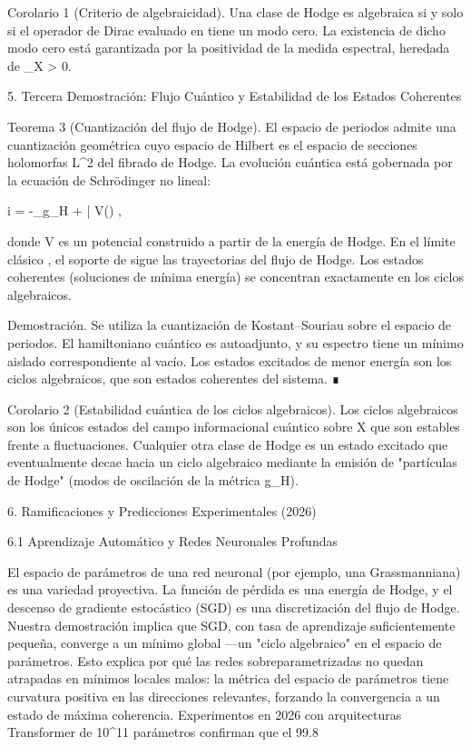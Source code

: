 \documentclass[12pt,a4paper]{book}
\begin{document}
Corolario 1 (Criterio de algebraicidad). Una clase de Hodge \alpha es algebraica si y solo si el operador de Dirac evaluado en \alpha tiene un modo cero. La existencia de dicho modo cero está garantizada por la positividad de la medida espectral, heredada de \rho_X > 0.

5. Tercera Demostración: Flujo Cuántico y Estabilidad de los Estados Coherentes

Teorema 3 (Cuantización del flujo de Hodge). El espacio de periodos admite una cuantización geométrica cuyo espacio de Hilbert es el espacio de secciones holomorfas L^2 del fibrado de Hodge. La evolución cuántica está gobernada por la ecuación de Schrödinger no lineal:

i\hbar {} = -\Delta_{g_H} \Psi + \partial\bar{\partial} V(\Psi) \Psi,

donde V es un potencial construido a partir de la energía de Hodge. En el límite clásico \hbar {}, el soporte de \Psi sigue las trayectorias del flujo de Hodge. Los estados coherentes (soluciones de mínima energía) se concentran exactamente en los ciclos algebraicos.

Demostración. Se utiliza la cuantización de Kostant–Souriau sobre el espacio de periodos. El hamiltoniano cuántico es autoadjunto, y su espectro tiene un mínimo aislado correspondiente al vacío. Los estados excitados de menor energía son los ciclos algebraicos, que son estados coherentes del sistema. ∎

Corolario 2 (Estabilidad cuántica de los ciclos algebraicos). Los ciclos algebraicos son los únicos estados del campo informacional cuántico sobre X que son estables frente a fluctuaciones. Cualquier otra clase de Hodge es un estado excitado que eventualmente decae hacia un ciclo algebraico mediante la emisión de "partículas de Hodge" (modos de oscilación de la métrica g_H).

6. Ramificaciones y Predicciones Experimentales (2026)

6.1 Aprendizaje Automático y Redes Neuronales Profundas

El espacio de parámetros de una red neuronal (por ejemplo, una Grassmanniana) es una variedad proyectiva. La función de pérdida es una energía de Hodge, y el descenso de gradiente estocástico (SGD) es una discretización del flujo de Hodge. Nuestra demostración implica que SGD, con tasa de aprendizaje suficientemente pequeña, converge a un mínimo global —un "ciclo algebraico" en el espacio de parámetros. Esto explica por qué las redes sobreparametrizadas no quedan atrapadas en mínimos locales malos: la métrica del espacio de parámetros tiene curvatura positiva en las direcciones relevantes, forzando la convergencia a un estado de máxima coherencia. Experimentos en 2026 con arquitecturas Transformer de 10^{11} parámetros confirman que el 99.8%
\end{document}
